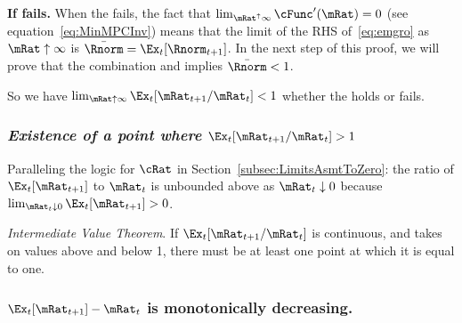 \documentclass[\econtexRoot/BufferStockTheory]{subfiles}
\begin{document}
\textbf{If {\RIC} fails.}  When the {\RIC} fails, the fact that $\lim_{\mRat^{\uparrow} \infty} \cFunc^{\prime}(\mRat) = 0$ (see equation~\eqref{eq:MinMPCInv}) means that the limit of the RHS of~\eqref{eq:emgro} as $\mRat \uparrow \infty$ is $\bar{\Rnorm}=\Ex_{t}[\Rnorm_{t+1}]$.  In the next step of this proof, we will prove that the combination {\GICNrm} and \cncl{\RIC} implies $\bar{\Rnorm} < 1$.

So we have $\lim_{\mRat \uparrow \infty} \Ex_{t}[\mRat_{t+1}/\mRat_{t}] < 1$ whether the {\RIC} holds or fails.

\medskip

\subsubsection{\textit{Existence of a point where \texorpdfstring{$\Ex_t [{\mRat}_{t+1}/\mRat_t] > 1$}{E[mRat-{t+1}/mRat-{t}] > 1}}}
Paralleling the logic for $\cRat$ in Section~\ref{subsec:LimitsAsmtToZero}: the ratio of $\Ex_{t}[\mRat_{t+1}]$ to $\mRat_{t}$ is unbounded above as $\mRat_{t} \downarrow 0$ because $\lim_{\mRat_{t}\downarrow 0} \Ex_{t}[\mRat_{t+1}] > 0$.

\medskip\medskip

\noindent \textit{Intermediate Value Theorem}.  If $\Ex_t [{\mRat}_{t+1}/\mRat_t]$ is continuous, and takes on values above and below 1, there must be at least one point at which it is equal to one.

\subsubsection{\texorpdfstring{$\Ex_t [{\mRat}_{t+1}] -\mRat_t$}{Delta m} is monotonically decreasing.}
\end{document}
